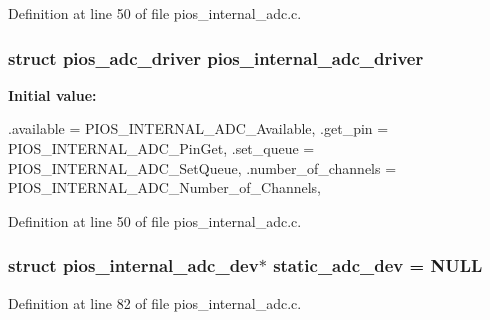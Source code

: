 \-Definition at line 50 of file pios\-\_\-internal\-\_\-adc.\-c.

\hypertarget{group___p_i_o_s___i_n_t_e_r_n_a_l___a_d_c_gaa1decc30319efc11cab3d3e9ba32ff8e}{
\subsubsection[{pios\-\_\-internal\-\_\-adc\-\_\-driver}]{\setlength{\rightskip}{0pt plus 5cm}struct {\bf pios\-\_\-adc\-\_\-driver} {\bf pios\-\_\-internal\-\_\-adc\-\_\-driver}}}\label{group___p_i_o_s___i_n_t_e_r_n_a_l___a_d_c_gaa1decc30319efc11cab3d3e9ba32ff8e}
{\bfseries \-Initial value\-:}
\begin{DoxyCode}
 {
                .available      = PIOS_INTERNAL_ADC_Available,
                .get_pin        = PIOS_INTERNAL_ADC_PinGet,
                .set_queue      = PIOS_INTERNAL_ADC_SetQueue,
                .number_of_channels = PIOS_INTERNAL_ADC_Number_of_Channels,
}
\end{DoxyCode}


\-Definition at line 50 of file pios\-\_\-internal\-\_\-adc.\-c.

\hypertarget{group___p_i_o_s___i_n_t_e_r_n_a_l___a_d_c_ga98f54a9670626234febef25763cd6660}{
\subsubsection[{static\-\_\-adc\-\_\-dev}]{\setlength{\rightskip}{0pt plus 5cm}struct {\bf pios\-\_\-internal\-\_\-adc\-\_\-dev}$\ast$ {\bf static\-\_\-adc\-\_\-dev} = \-N\-U\-L\-L}}\label{group___p_i_o_s___i_n_t_e_r_n_a_l___a_d_c_ga98f54a9670626234febef25763cd6660}


\-Definition at line 82 of file pios\-\_\-internal\-\_\-adc.\-c.

